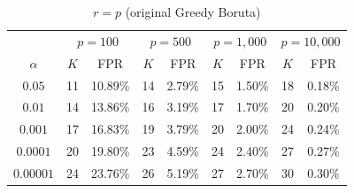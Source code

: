 \documentclass[runningheads]{llncs}
\begin{document}
\begin{table}[H]
\begin{subtable}{\textwidth}
\centering
\caption{$r = p$ (original Greedy Boruta)}
\begin{tabular}{c|cc|cc|cc|cc}
\toprule
& \multicolumn{2}{c|}{$p = 100$}
& \multicolumn{2}{c|}{$p = 500$}
& \multicolumn{2}{c|}{$p = 1{,}000$}
& \multicolumn{2}{c}{$p = 10{,}000$} \\
$\alpha$
& $K$ & FPR
& $K$ & FPR
& $K$ & FPR
& $K$ & FPR \\
\midrule
$0.05$    & 11 & 10.89\% & 14 & 2.79\% & 15 & 1.50\% & 18 & 0.18\% \\
$0.01$    & 14 & 13.86\% & 16 & 3.19\% & 17 & 1.70\% & 20 & 0.20\% \\
$0.001$   & 17 & 16.83\% & 19 & 3.79\% & 20 & 2.00\% & 24 & 0.24\% \\
$0.0001$  & 20 & 19.80\% & 23 & 4.59\% & 24 & 2.40\% & 27 & 0.27\% \\
$0.00001$ & 24 & 23.76\% & 26 & 5.19\% & 27 & 2.70\% & 30 & 0.30\% \\
\bottomrule
\end{tabular}
\end{subtable}
\label{tab:fpr_shadows}
\end{table}
\end{document}
